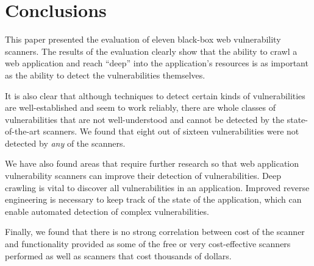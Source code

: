 

\section{Conclusions}

This  paper presented  the evaluation  of eleven  black-box  web vulnerability
scanners.   The results of  the evaluation  clearly show  that the  ability to
crawl a web application and reach ``deep'' into the application's resources is
as important as the ability to detect the vulnerabilities themselves.

It  is  also   clear  that  although  techniques  to   detect  certain  kinds  of
vulnerabilities are well-established and seem to work reliably, there are whole
classes of vulnerabilities that are not well-understood and cannot be detected
by the  state-of-the-art scanners. We found that  eight out of
sixteen vulnerabilities were not detected by \emph{any} of the
scanners.

We have also found areas that require further research so that web
application vulnerability scanners can improve their detection of
vulnerabilities. Deep crawling is vital to discover all
vulnerabilities in an application. Improved reverse engineering is
necessary to keep track of the state of the application, which can enable
automated detection of complex vulnerabilities.

Finally, we found that there is no strong correlation between cost of the scanner
and functionality provided as some of the free or very cost-effective scanners
performed as well as scanners that cost thousands of dollars.



